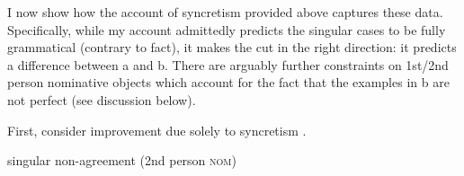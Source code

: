 \documentclass[output=paper]{langscibook}
\begin{document}
I now show how the account of \sti syncretism provided above captures these data. Specifically, while my account admittedly predicts the singular \sti cases to be fully grammatical (contrary to fact), it makes the cut in the right direction: it predicts a difference between a and b. There are arguably further constraints on 1st/2nd person nominative objects which account for the fact that the examples in b are not perfect (see discussion below). 

First, consider improvement due solely to syncretism \citep[33]{SigurTHsson:1996va}. 

\ea \label{woodsing} 
    \z
\z

\ea \datnom singular non-agreement (2nd person \textsc{nom})\smallskip\\
\z
\end{document}
